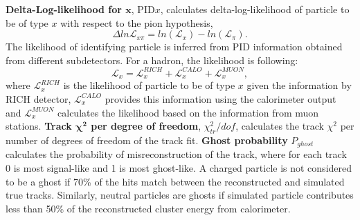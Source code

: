 \newline\textbf{Delta-Log-likelihood for $\boldsymbol{x}$}, PID${x}$, calculates delta-log-likelihood of particle to be of type $x$ with respect to the pion hypothesis,
\begin{equation}
\Delta ln\mathcal{L}_{x\pi} =  ln(\mathcal{L}_{x})-ln(\mathcal{L}_{\pi}).
\end{equation}
The likelihood of identifying particle is inferred from PID information obtained from  different subdetectors. For a hadron, the likelihood is following:
\begin{equation}
\mathcal{L}_{x} = \mathcal{L}_{x}^{RICH} + \mathcal{L}_{x}^{CALO} + \mathcal{L}_{x}^{MUON},
\end{equation}
where $\mathcal{L}_{x}^{RICH}$ is the likelihood of particle to be of type $x$ given the information by RICH detector, $\mathcal{L}_{x}^{CALO}$ provides this information using the calorimeter output and $\mathcal{L}_{x}^{MUON}$ calculates the likelihood based on the information from muon stations. 
\newline\textbf{Track $\boldsymbol{\chi^{2}}$ per degree of freedom}, ${\chi^{2}_{tr}/dof}$, calculates the track $\chi^{2}$  per number of degrees of freedom of the
track fit.
\newline\textbf{Ghost probability} $P_{ghost}$ calculates the probability of misreconstruction of the track, where for each track 0 is most signal-like and 1 is most ghost-like. A charged particle is not considered to be a ghost if 70\% of the hits match between the reconstructed and simulated true tracks. Similarly, neutral particles are ghosts if simulated particle contributes less than 50\% of the reconstructed cluster energy from calorimeter.



